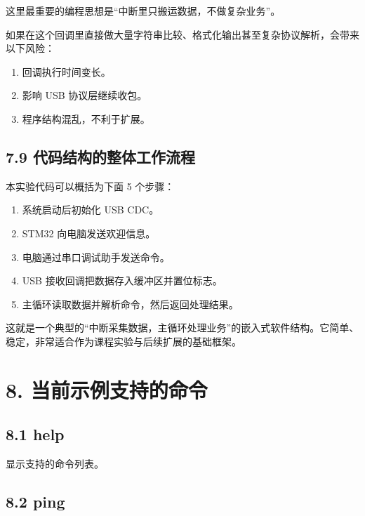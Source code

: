 \documentclass[
  chinese,
  UTF8,
  oneside,
  openany]{ctexbook}
\providecommand{\tightlist}{%
  \setlength{\itemsep}{0pt}\setlength{\parskip}{0pt}}
\begin{document}
这里最重要的编程思想是``中断里只搬运数据，不做复杂业务''。

如果在这个回调里直接做大量字符串比较、格式化输出甚至复杂协议解析，会带来以下风险：

\begin{enumerate}
\def\labelenumi{\arabic{enumi}.}
\tightlist
\item
  回调执行时间变长。
\item
  影响 USB 协议层继续收包。
\item
  程序结构混乱，不利于扩展。
\end{enumerate}

\subsection{7.9
代码结构的整体工作流程}\label{ux4ee3ux7801ux7ed3ux6784ux7684ux6574ux4f53ux5de5ux4f5cux6d41ux7a0b}

本实验代码可以概括为下面 5 个步骤：

\begin{enumerate}
\def\labelenumi{\arabic{enumi}.}
\tightlist
\item
  系统启动后初始化 USB CDC。
\item
  STM32 向电脑发送欢迎信息。
\item
  电脑通过串口调试助手发送命令。
\item
  USB 接收回调把数据存入缓冲区并置位标志。
\item
  主循环读取数据并解析命令，然后返回处理结果。
\end{enumerate}

这就是一个典型的``中断采集数据，主循环处理业务''的嵌入式软件结构。它简单、稳定，非常适合作为课程实验与后续扩展的基础框架。

\section{8.
当前示例支持的命令}\label{ux5f53ux524dux793aux4f8bux652fux6301ux7684ux547dux4ee4}

\subsection{8.1 help}\label{help}

显示支持的命令列表。

\subsection{8.2 ping}\label{ping}
\end{document}
